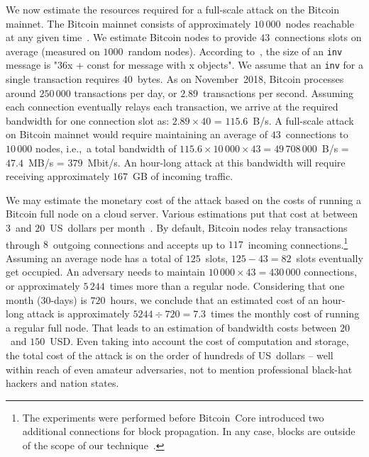 We now estimate the resources required for a full-scale attack on the Bitcoin mainnet.
The Bitcoin mainnet consists of approximately $10\,000$~nodes reachable at any given time~\cite{Bitnodes}.
We estimate Bitcoin nodes to provide $43$~connections slots on average (measured on $1000$~random nodes).
According to~\cite{BitcoinWiki}, the size of an \texttt{inv} message is "36x + const for message with x objects".
We assume that an \texttt{inv} for a single transaction requires $40$~bytes.
As on November~2018, Bitcoin processes around $250\,000$ transactions per day, or $2.89$~transactions per second.
Assuming each connection eventually relays each transaction, we arrive at the required bandwidth for one connection slot as: $2.89 \times 40$ = $115.6$~B/s.
A full-scale attack on Bitcoin mainnet would require maintaining an average of $43$~connections to $10\,000$ nodes, i.e.,~a total bandwidth of $115.6 \times 10\,000 \times 43 = 49\,708\,000$~B/s = $47.4$~MB/s = $379$~Mbit/s.
An hour-long attack at this bandwidth will require receiving approximately $167$~GB of incoming traffic.

We may estimate the monetary cost of the attack based on the costs of running a Bitcoin full node on a cloud server.
Various estimations put that cost at between $3$~and $20$~US~dollars per month~\cite{Zeyde2018, Connell2017}.
By default, Bitcoin nodes relay transactions through $8$~outgoing connections and accepts up to $117$~incoming connections.\footnote{The experiments were performed before Bitcoin~Core introduced two additional connections for block propagation. In any case, blocks are outside of the scope of our technique~\cite{Daftuar2019}.}
Assuming an average node has a total of $125$~slots, $125 - 43 = 82$~slots eventually get occupied.
An adversary needs to maintain $10\,000 \times 43 = 430\,000$ connections, or approximately $5\,244$~times more than a regular node.
Considering that one month ($30$-days) is $720$~hours, we conclude that an estimated cost of an hour-long attack is approximately $5244 \div 720 = 7.3$~times the monthly cost of running a regular full node.
That leads to an estimation of bandwidth costs between $20$~and $150$~USD\@.
Even taking into account the cost of computation and storage, the total cost of the attack is on the order of hundreds of US~dollars -- well within reach of even amateur adversaries, not to mention professional black-hat hackers and nation states.

